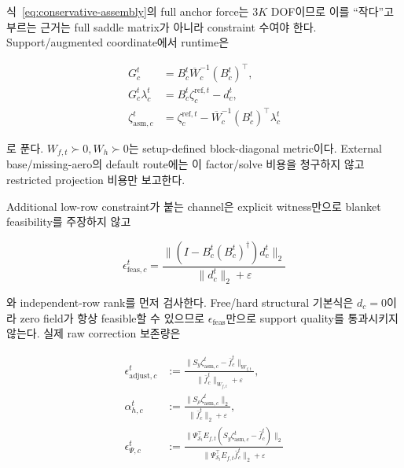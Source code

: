 \documentclass[11pt,a4paper]{article}
\newcommand{\eps}{\varepsilon}
\begin{document}
식~\eqref{eq:conservative-assembly}의 full anchor force는 \(3K\) DOF이므로
이를 ``작다''고 부르는 근거는 full saddle matrix가 아니라 constraint 수여야 한다.
Support/augmented coordinate에서 runtime은

\begin{equation}
\begin{aligned}
  G_c^t&=B_c^t\overline W_c^{-1}(B_c^t)^\top,\\
  G_c^t\lambda_c^t&=B_c^t\zeta_c^{\mathrm{ref},t}-d_c^t,\\
  \zeta_{\mathrm{asm},c}^t
  &=\zeta_c^{\mathrm{ref},t}
  -\overline W_c^{-1}(B_c^t)^\top\lambda_c^t
\end{aligned}
  \label{eq:runtime-joint-schur}
\end{equation}

로 푼다. \(W_{f,t}\succ0,W_h\succ0\)는 setup-defined block-diagonal metric이다.
External base/missing-aero의 default route에는 이 factor/solve 비용을 청구하지 않고
restricted projection 비용만 보고한다.

Additional low-row constraint가 붙는 channel은 explicit witness만으로 blanket feasibility를 주장하지 않고

\begin{equation}
  \epsilon_{\mathrm{feas},c}^t
  =
  \frac{\|(I-B_c^t(B_c^t)^\dagger)d_c^t\|_2}
       {\|d_c^t\|_2+\eps}
  \label{eq:joint-feasibility-residual}
\end{equation}

와 independent-row rank를 먼저 검사한다.
Free/hard structural 기본식은 \(d_c=0\)이라 zero field가 항상 feasible할 수 있으므로
\(\epsilon_{\mathrm{feas}}\)만으로 support quality를 통과시키지 않는다. 실제 raw correction 보존량은

\begin{equation}
\begin{aligned}
  \epsilon_{\mathrm{adjust},c}^t
  &:={}\frac{\|S_y\zeta_{\mathrm{asm},c}^t-\bar f_c^t\|_{W_{f,t}}}
              {\|\bar f_c^t\|_{W_{f,t}}+\eps},\\
  \alpha_{h,c}^t
  &:={}\frac{\|S_\rho\zeta_{\mathrm{asm},c}^t\|_2}
              {\|\bar f_c^t\|_2+\eps},\\
  \epsilon_{\Psi,c}^t
  &:={}\frac{\|
  \Psi_{\mathcal S_t}^\top E_{f,t}
  (S_y\zeta_{\mathrm{asm},c}^t-\bar f_c^t)\|_2}
  {\|\Psi_{\mathcal S_t}^\top E_{f,t}\bar f_c^t\|_2+\eps}
  \label{eq:structural-schur-adjustment-diagnostics}
\end{aligned}
\end{equation}
\end{document}

